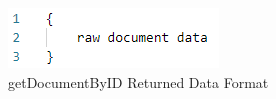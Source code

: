 \begin{figure}[H]
    \centering
    \includegraphics{img/getdocumentbyid2.PNG}
    \caption{getDocumentByID Returned Data Format}
    \label{fig:getdocumentbyid2}
\end{figure}
